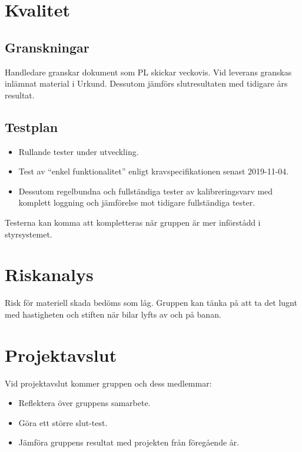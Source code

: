 \documentclass[10pt,swedish,oneside]{lips-no_customer}
\begin{document}
	\section{Kvalitet}
		\subsection{Granskningar}
		Handledare granskar dokument som PL skickar veckovis. Vid leverans granskas inlämnat material i Urkund. Dessutom jämförs slutresultaten med tidigare års resultat.
		\subsection{Testplan}
		\begin{itemize}
			\item Rullande tester under utveckling.
			\item Test av ``enkel funktionalitet'' enligt kravspecifikationen senast 2019-11-04.
			\item Dessutom regelbundna och fullständiga tester av kalibreringsvarv med komplett loggning och jämförelse mot tidigare fullständiga tester.
		\end{itemize}
		Testerna kan komma att kompletteras när gruppen är mer införstådd i styrsystemet.
	
	\section{Riskanalys}
		Risk för materiell skada bedöms som låg. Gruppen kan tänka på att ta det lugnt med hastigheten och stiften när bilar lyfts av och på banan.
	
	\section{Projektavslut}
		Vid projektavslut kommer gruppen och dess medlemmar:
		\begin{itemize}
			\item Reflektera över gruppens samarbete.
			\item Göra ett större slut-test.
			\item Jämföra gruppens resultat med projekten från föregående år.
		\end{itemize}
	
\end{document}

